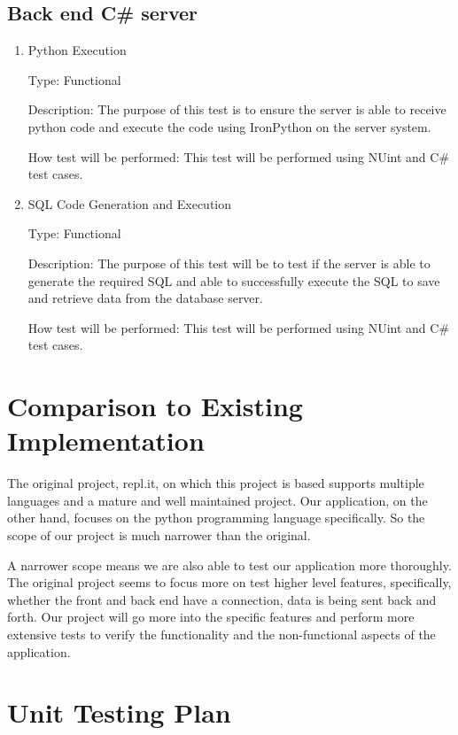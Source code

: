\documentclass[12pt, titlepage]{article}
\begin{document}
\subsection{Back end C\# server}

\begin{enumerate}

\item{Python Execution\\}

Type: Functional
					
Description: The purpose of this test is to ensure the server is able to
receive python code and execute the code using IronPython on the server system.
					
How test will be performed: This test will be performed using NUint and C\#
test cases.
					
\item{SQL Code Generation and Execution\\}

Type: Functional
					
Description: The purpose of this test will be to test if the server is able
to generate the required SQL and able to successfully execute the SQL to save
and retrieve data from the database server.
					
How test will be performed: This test will be performed using NUint and C\#
test cases.

\end{enumerate}
	
\section{Comparison to Existing Implementation}	
The original project, repl.it, on which this project is based supports multiple
languages and a mature and well maintained project. Our application, on the
other hand, focuses on the python programming language specifically. So the
scope of our project is much narrower than the original.

A narrower scope means we are also able to test our application more thoroughly.
The original project seems to focus more on test higher level features,
specifically, whether the front and back end have a connection, data is being
sent back and forth. Our project will go more into the specific features and
perform more extensive tests to verify the functionality and the non-functional
aspects of the application.

				
\section{Unit Testing Plan}
		
\end{document}
